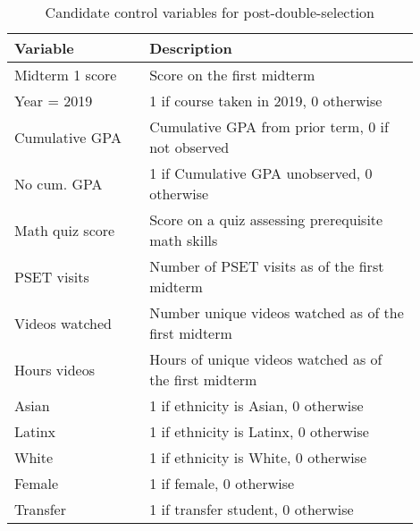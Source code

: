 \begin{spacing}{1.0} 
\begin{table} \centering \caption{Candidate control variables for post-double-selection} 
\label{controlvars_desc} 
\begin{threeparttable} 
\begin{tabular}{p{0.3\linewidth} p{0.6\linewidth}}
\toprule
        Variable &                                             Description \\
\midrule
 Midterm 1 score &                              Score on the first midterm \\
     Year = 2019 &                  1 if course taken in 2019, 0 otherwise \\
  Cumulative GPA &       Cumulative GPA from prior term, 0 if not observed \\
     No cum. GPA &             1 if Cumulative GPA unobserved, 0 otherwise \\
 Math quiz score &      Score on a quiz assessing prerequisite math skills \\
     PSET visits &           Number of PSET visits as of the first midterm \\
  Videos watched &    Number unique videos watched as of the first midterm \\
    Hours videos &  Hours of unique videos watched as of the first midterm \\
           Asian &                    1 if ethnicity is Asian, 0 otherwise \\
          Latinx &                   1 if ethnicity is Latinx, 0 otherwise \\
           White &                    1 if ethnicity is White, 0 otherwise \\
          Female &                                1 if female, 0 otherwise \\
        Transfer &                      1 if transfer student, 0 otherwise \\
\bottomrule
\end{tabular}
\end{threeparttable}
\end{table} 
\end{spacing}